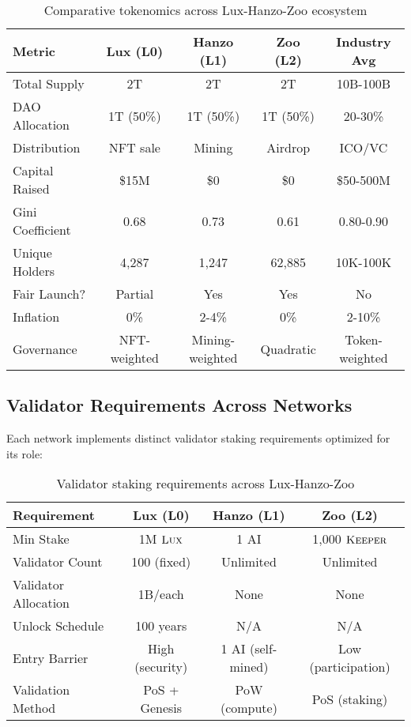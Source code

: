 \documentclass[11pt,letterpaper]{article}
\theoremstyle{definition}
\theoremstyle{remark}
\newcommand{\KEEPER}{\textsc{Keeper}}
\newcommand{\Lux}{\textsc{Lux}}
\begin{document}
\begin{table}[h]
\centering
\small
\begin{tabular}{lcccc}
\toprule
\textbf{Metric} & \textbf{Lux (L0)} & \textbf{Hanzo (L1)} & \textbf{Zoo (L2)} & \textbf{Industry Avg} \\
\midrule
Total Supply & 2T & 2T & 2T & 10B-100B \\
DAO Allocation & 1T (50\%) & 1T (50\%) & 1T (50\%) & 20-30\% \\
Distribution & NFT sale & Mining & Airdrop & ICO/VC \\
Capital Raised & \$15M & \$0 & \$0 & \$50-500M \\
Gini Coefficient & 0.68 & 0.73 & 0.61 & 0.80-0.90 \\
Unique Holders & 4,287 & 1,247 & 62,885 & 10K-100K \\
Fair Launch? & Partial & Yes & Yes & No \\
Inflation & 0\% & 2-4\% & 0\% & 2-10\% \\
Governance & NFT-weighted & Mining-weighted & Quadratic & Token-weighted \\
\bottomrule
\end{tabular}
\caption{Comparative tokenomics across Lux-Hanzo-Zoo ecosystem}
\label{tab:cross_network}
\end{table}

\subsection{Validator Requirements Across Networks}

Each network implements distinct validator staking requirements optimized for its role:

\begin{table}[h]
\centering
\begin{tabular}{lccc}
\toprule
\textbf{Requirement} & \textbf{Lux (L0)} & \textbf{Hanzo (L1)} & \textbf{Zoo (L2)} \\
\midrule
Min Stake & 1M $\Lux$ & 1 AI & 1,000 $\KEEPER$ \\
Validator Count & 100 (fixed) & Unlimited & Unlimited \\
Validator Allocation & 1B/each & None & None \\
Unlock Schedule & 100 years & N/A & N/A \\
Entry Barrier & High (security) & 1 AI (self-mined) & Low (participation) \\
Validation Method & PoS + Genesis & PoW (compute) & PoS (staking) \\
\bottomrule
\end{tabular}
\caption{Validator staking requirements across Lux-Hanzo-Zoo}
\label{tab:validator_comparison}
\end{table}
\end{document}

